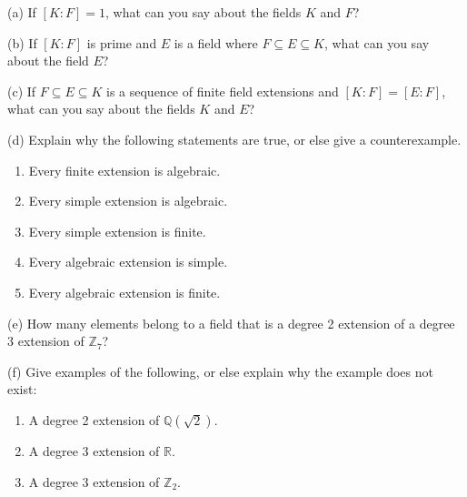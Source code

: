 \begin{problem}[Warmup]{(a)}
    If $[K : F] = 1$, what can you say about the fields $K$ and $F$?
\end{problem}
\unsolved

\begin{problem}[Warmup]{(b)}
    If $[K : F]$ is prime and $E$ is a field where $F \subseteq E \subseteq K$, what can you say about the field $E$?
\end{problem}
\unsolved

\begin{problem}[Warmup]{(c)}
    If $F \subseteq E \subseteq K$ is a sequence of finite field extensions and $[K : F] = [E : F]$, what can you say about the fields $K$ and $E$?
\end{problem}
\unsolved

\begin{problem}[Warmup]{(d)}
    Explain why the following statements are true, or else give a counterexample.
    \begin{enumerate}
        \item[(a)] Every finite extension is algebraic.
        \item[(b)] Every simple extension is algebraic.
        \item[(c)] Every simple extension is finite.
        \item[(d)] Every algebraic extension is simple.
        \item[(e)] Every algebraic extension is finite.
    \end{enumerate}
\end{problem}
\unsolved

\begin{problem}[Warmup]{(e)}
    How many elements belong to a field that is a degree 2 extension of a degree 3 extension of $\mathbb{Z}_7$?
\end{problem}
\unsolved

\begin{problem}[Warmup]{(f)}
    Give examples of the following, or else explain why the example does not exist:
    \begin{enumerate}
        \item[(a)] A degree 2 extension of $\mathbb{Q}(\sqrt{2})$.
        \item[(b)] A degree 3 extension of $\mathbb{R}$.
        \item[(c)] A degree 3 extension of $\mathbb{Z}_2$.
    \end{enumerate}
\end{problem}
\unsolved

